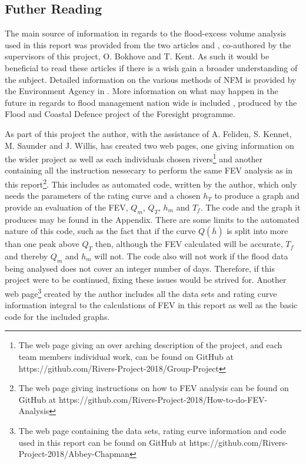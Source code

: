 \documentclass[11pt,a4paper]{article}
\begin{document}
\subsection{Futher Reading}
The main source of information in regards to the flood-excess volume analysis used in this report was provided from the two articles \cite{Aire} and \cite{Calder-Don}, co-authored by the supervisors of this project, O. Bokhove and T. Kent. As such it would be beneficial to read these articles if there is a wish gain a broader understanding of the subject. Detailed information on the various methods of NFM is provided by the Environment Agency in \cite{nfm}. More information on what may happen in the future in regards to flood management nation wide is included \cite{foresight}, produced by the Flood and Coastal Defence project of the Foresight programme.

As part of this project the author, with the assistance of A. Feliden, S. Kennet, M. Saunder and J. Willis, has created two web pages, one giving information on the wider project as well as each individuals chosen rivers\footnote{The web page giving an over arching description of the project, and each team members individual work, can be found on GitHub at https://github.com/Rivers-Project-2018/Group-Project} and another  containing all the instruction nessecary to perform the same FEV analysis as in this report\footnote{The web page giving instructions on how to FEV analysis can be found on GitHub at https://github.com/Rivers-Project-2018/How-to-do-FEV-Analysis}. This includes as automated code, written by the author, which only needs the parameters of the rating curve and a chosen $h_T$ to produce a graph and provide an evaluation of the FEV, $Q_m$, $Q_T$, $h_m$ and $T_f$. The code and the graph it produces may be found in the Appendix. There are some limits to the automated nature of this code, such as the fact that if the curve $Q(\overline{h})$ is split into more than one peak above $Q_T$ then, although the FEV calculated will be accurate, $T_f$ and thereby $Q_m$ and $h_m$ will not. The code also will not work if the flood data being analysed does not cover an integer number of days. Therefore, if this project were to be continued, fixing these issues would be strived for. Another web page\footnote{The web page containing the data sets, rating curve information and code used in this report can be found on GitHub at https://github.com/Rivers-Project-2018/Abbey-Chapman} created by the author includes all the data sets and rating curve information integral to the calculations of FEV in this report as well as the basic code for the included graphs.
\end{document}

